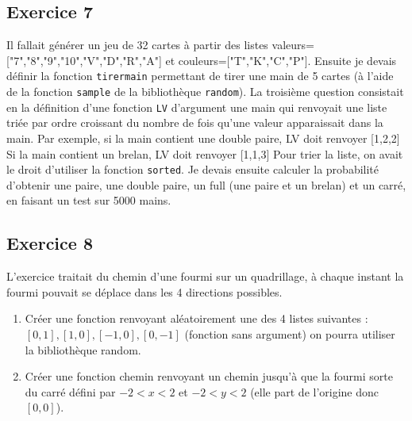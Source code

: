 \documentclass[10pt,fleqn]{article} %
\begin{document}
\begin{multicols}{2}
%    
%    
%    
%
%
%    
%
%

\subsection*{Exercice 7}
Il fallait générer un jeu de 32 cartes à partir des listes valeurs=["7","8","9","10","V","D","R","A"] et couleurs=["T","K","C","P"].
Ensuite je devais définir la fonction \texttt{tirermain} permettant de tirer une main de 5 cartes (à l'aide de la fonction \texttt{sample} de la bibliothèque \texttt{random}).
La troisième question consistait en la définition d'une fonction \texttt{LV} d'argument une main qui renvoyait une liste triée par ordre croissant du nombre de fois qu'une valeur apparaissait dans la main.
Par exemple, si la main contient une double paire, LV doit renvoyer [1,2,2]
Si la main contient un brelan, LV doit renvoyer [1,1,3]
Pour trier la liste, on avait le droit d'utiliser la fonction \texttt{sorted}.
Je devais ensuite calculer la probabilité d'obtenir une paire, une double paire, un full (une paire et  un brelan) et un carré, en faisant un test sur 5000 mains.

\subsection*{Exercice 8}
L'exercice traitait du chemin d'une fourmi sur un quadrillage, à chaque instant la fourmi pouvait se déplace dans les 4 directions possibles.

\begin{enumerate}
\item Créer une fonction renvoyant aléatoirement une des 4 listes suivantes : $[0,1] , [1,0] , [-1,0] , [0,-1]$  (fonction sans argument)
on pourra utiliser la bibliothèque random.
\item Créer une fonction chemin renvoyant un chemin jusqu'à que la fourmi sorte du carré défini par $-2< x < 2$ et $-2 < y < 2$ (elle part de l'origine donc $[0,0]$).
 

\end{enumerate}
\end{multicols}
\end{document}
